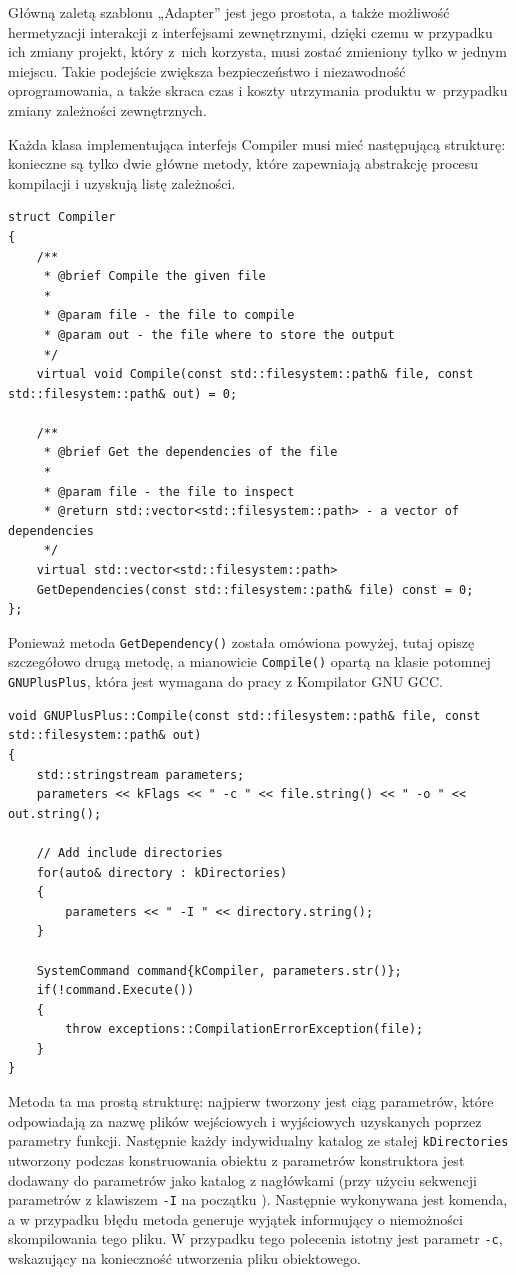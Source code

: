 Główną zaletą szablonu „Adapter” jest jego prostota, a także możliwość hermetyzacji interakcji z interfejsami zewnętrznymi, dzięki czemu w przypadku ich zmiany projekt, który z~nich korzysta, musi zostać zmieniony tylko w jednym miejscu. Takie podejście zwiększa bezpieczeństwo i niezawodność oprogramowania, a także skraca czas i koszty utrzymania produktu w~przypadku zmiany zależności zewnętrznych.

Każda klasa implementująca interfejs Compiler musi mieć następującą strukturę: konieczne są tylko dwie główne metody, które zapewniają abstrakcję procesu kompilacji i uzyskują listę zależności.

\begin{lstlisting}[label=list:compiler,caption=Struktura interfejsu Compiler,basicstyle=\footnotesize\ttfamily]
struct Compiler
{
	/**
	 * @brief Compile the given file
	 * 
	 * @param file - the file to compile
	 * @param out - the file where to store the output
	 */
	virtual void Compile(const std::filesystem::path& file, const std::filesystem::path& out) = 0;

	/**
	 * @brief Get the dependencies of the file
	 * 
	 * @param file - the file to inspect
	 * @return std::vector<std::filesystem::path> - a vector of dependencies
	 */
	virtual std::vector<std::filesystem::path>
	GetDependencies(const std::filesystem::path& file) const = 0;
};
\end{lstlisting}

Ponieważ metoda \texttt{GetDependency()} została omówiona powyżej, tutaj opiszę szczegółowo drugą metodę, a mianowicie \texttt{Compile()} opartą na klasie potomnej \texttt{GNUPlusPlus}, która jest wymagana do pracy z Kompilator GNU GCC.

\begin{lstlisting}[label=list:gnu_compiler,caption=Implementacja metody GNUPlusPlus::Compile(),basicstyle=\footnotesize\ttfamily]
void GNUPlusPlus::Compile(const std::filesystem::path& file, const std::filesystem::path& out)
{
	std::stringstream parameters;
	parameters << kFlags << " -c " << file.string() << " -o " << out.string();

	// Add include directories
	for(auto& directory : kDirectories)
	{
		parameters << " -I " << directory.string();
	}

	SystemCommand command{kCompiler, parameters.str()};
	if(!command.Execute())
	{
		throw exceptions::CompilationErrorException(file);
	}
}
\end{lstlisting}

Metoda ta ma prostą strukturę: najpierw tworzony jest ciąg parametrów, które odpowiadają za nazwę plików wejściowych i wyjściowych uzyskanych poprzez parametry funkcji. Następnie każdy indywidualny katalog ze stałej \texttt{kDirectories} utworzony podczas konstruowania obiektu z parametrów konstruktora jest dodawany do parametrów jako katalog z nagłówkami (przy użyciu sekwencji parametrów z klawiszem \texttt{-I} na początku \cite{gcc}). Następnie wykonywana jest komenda, a w przypadku błędu metoda generuje wyjątek informujący o niemożności skompilowania tego pliku. W przypadku tego polecenia istotny jest parametr \texttt{-c}, wskazujący na konieczność utworzenia pliku obiektowego.

